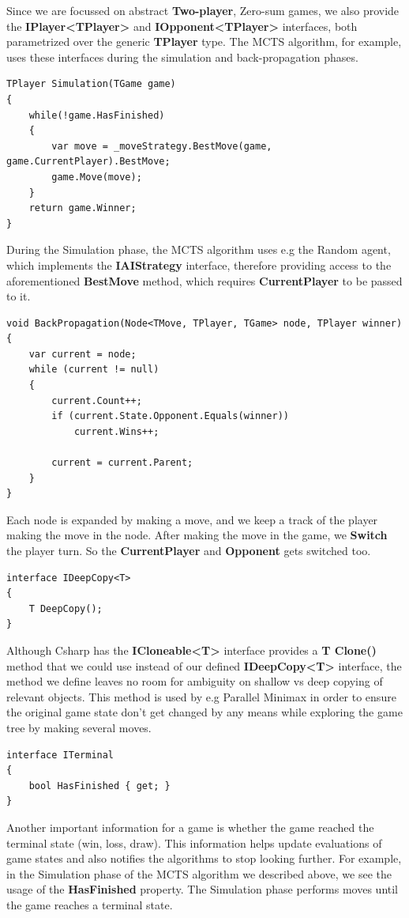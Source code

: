 Since we are focussed on abstract \textbf{Two-player}, Zero-sum games, we also provide the \textbf{IPlayer\textless{}TPlayer\textgreater{}} and \textbf{IOpponent\textless{}TPlayer\textgreater{}} interfaces, both parametrized over the generic \textbf{TPlayer} type.
The \gls{MCTS} algorithm, for example, uses these interfaces during the simulation and back-propagation phases.
\begin{lstlisting}
TPlayer Simulation(TGame game)
{
    while(!game.HasFinished)
    {
        var move = _moveStrategy.BestMove(game, game.CurrentPlayer).BestMove;
        game.Move(move);
    }
    return game.Winner;
}
\end{lstlisting}
During the Simulation phase, the \gls{MCTS} algorithm uses e.g the Random agent, which implements the \textbf{IAIStrategy} interface, therefore providing access to the aforementioned \textbf{BestMove} method, which requires \textbf{CurrentPlayer} to be passed to it.

\begin{lstlisting}
void BackPropagation(Node<TMove, TPlayer, TGame> node, TPlayer winner)
{
    var current = node;
    while (current != null)
    {
        current.Count++;
        if (current.State.Opponent.Equals(winner))
            current.Wins++;

        current = current.Parent;
    }
}
\end{lstlisting}
Each node is expanded by making a move, and we keep a track of the player making the move in the node. After making the move in the game, we \textbf{Switch} the player turn. So the \textbf{CurrentPlayer} and \textbf{Opponent} gets switched too.

\begin{lstlisting}
interface IDeepCopy<T>
{
    T DeepCopy();
}
\end{lstlisting}
Although \gls{Csharp} has the \textbf{ICloneable\textless{}T\textgreater{}} interface provides a \textbf{T Clone()} method that we could use instead of our defined \textbf{IDeepCopy\textless{}T\textgreater{}} interface, the method we define leaves no room for ambiguity on shallow vs deep copying of relevant objects.
This method is used by e.g Parallel Minimax in order to ensure the original game state don't get changed by any means while exploring the game tree by making several moves.

\begin{lstlisting}
interface ITerminal
{
    bool HasFinished { get; }
}
\end{lstlisting}
Another important information for a game is whether the game reached the terminal state (win, loss, draw). This information helps update evaluations of game states and also notifies the algorithms to stop looking further. For example, in the Simulation phase of the \gls{MCTS} algorithm we described above, we see the usage of the \textbf{HasFinished} property. The Simulation phase performs moves until the game reaches a terminal state.

